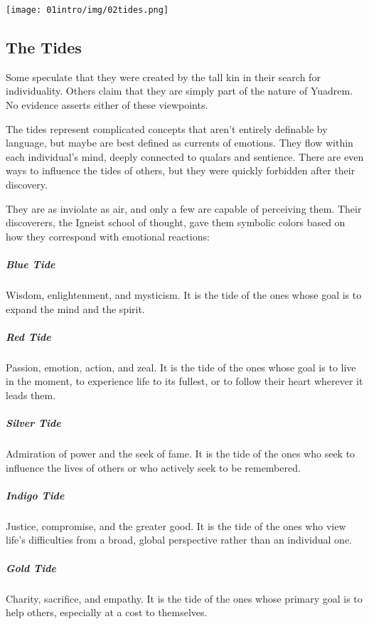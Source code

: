 \begin{linenumbers}
\begin{center}
    \texttt{[image: 01intro/img/02tides.png]}
\end{center}

\subsection*{The Tides} \label{ssec::tides}
Some speculate that they were created by the tall kin in their search for individuality.
Others claim that they are simply part of the nature of Yuadrem.
No evidence asserts either of these viewpoints.

The tides represent complicated concepts that aren't entirely definable by language, but maybe are best defined as currents of emotions.
They flow within each individual's mind, deeply connected to qualars and sentience.
There are even ways to influence the tides of others, but they were quickly forbidden after their discovery.

They are as inviolate as air, and only a few are capable of perceiving them.
Their discoverers, the Igneist school of thought, gave them symbolic colors based on how they correspond with emotional reactions:

\subparagraph{Blue Tide} Wisdom, enlightenment, and mysticism.
It is the tide of the ones whose goal is to expand the mind and the spirit.

\subparagraph{Red Tide} Passion, emotion, action, and zeal.
It is the tide of the ones whose goal is to live in the moment, to experience life to its fullest, or to follow their heart wherever it leads them.

\subparagraph{Silver Tide} Admiration of power and the seek of fame.
It is the tide of the ones who seek to influence the lives of others or who actively seek to be remembered.

\subparagraph{Indigo Tide} Justice, compromise, and the greater good.
It is the tide of the ones who view life's difficulties from a broad, global perspective rather than an individual one.

\subparagraph{Gold Tide} Charity, sacrifice, and empathy.
It is the tide of the ones whose primary goal is to help others, especially at a cost to themselves.


\end{linenumbers}
